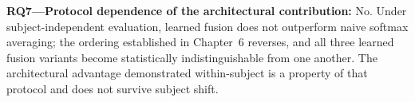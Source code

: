 \textbf{RQ7---Protocol dependence of the architectural contribution:} No. Under
subject-independent evaluation, learned fusion does not outperform naive
softmax averaging; the ordering established in Chapter~6 reverses, and all three
learned fusion variants become statistically indistinguishable from one another. The
architectural advantage demonstrated within-subject is a property of that protocol and
does not survive subject shift.
